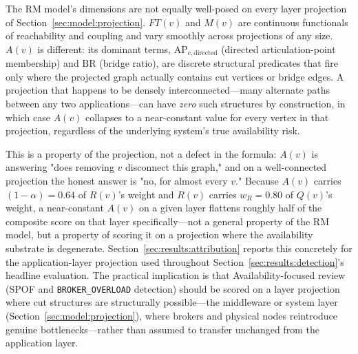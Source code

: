 The RM model's dimensions are not equally well-posed on every layer projection of Section~\ref{sec:model:projection}. $FT(v)$ and $M(v)$ are continuous functionals of reachability and coupling and vary smoothly across projections of any size. $A(v)$ is different: its dominant terms, $\mathrm{AP}_{c,\text{directed}}$ (directed articulation-point membership) and $\mathrm{BR}$ (bridge ratio), are discrete structural predicates that fire only where the projected graph actually contains cut vertices or bridge edges. A projection that happens to be densely interconnected---many alternate paths between any two applications---can have \emph{zero} such structures by construction, in which case $A(v)$ collapses to a near-constant value for every vertex in that projection, regardless of the underlying system's true availability risk.

This is a property of the projection, not a defect in the formula: $A(v)$ is answering "does removing $v$ disconnect this graph," and on a well-connected projection the honest answer is "no, for almost every $v$." Because $A(v)$ carries $(1-\alpha) = 0.64$ of $R(v)$'s weight and $R(v)$ carries $w_R = 0.80$ of $Q(v)$'s weight, a near-constant $A(v)$ on a given layer flattens roughly half of the composite score on that layer specifically---not a general property of the RM model, but a property of scoring it on a projection where the availability substrate is degenerate. Section~\ref{sec:results:attribution} reports this concretely for the application-layer projection used throughout Section~\ref{sec:results:detection}'s headline evaluation. The practical implication is that Availability-focused review (SPOF and \texttt{BROKER\_OVERLOAD} detection) should be scored on a layer projection where cut structures are structurally possible---the middleware or system layer (Section~\ref{sec:model:projection}), where brokers and physical nodes reintroduce genuine bottlenecks---rather than assumed to transfer unchanged from the application layer.
